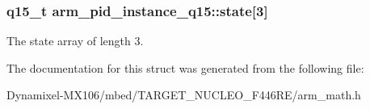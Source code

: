 \subsubsection[{\texorpdfstring{state}{state}}]{\setlength{\rightskip}{0pt plus 5cm}q15\+\_\+t arm\+\_\+pid\+\_\+instance\+\_\+q15\+::state\mbox{[}3\mbox{]}}\hypertarget{structarm__pid__instance__q15_a4a3f0a878b5b6b055e3478a2f244cd30}{}\label{structarm__pid__instance__q15_a4a3f0a878b5b6b055e3478a2f244cd30}
The state array of length 3. 

The documentation for this struct was generated from the following file\+:\begin{DoxyCompactItemize}
\item 
Dynamixel-\/\+M\+X106/mbed/\+T\+A\+R\+G\+E\+T\+\_\+\+N\+U\+C\+L\+E\+O\+\_\+\+F446\+R\+E/arm\+\_\+math.\+h\end{DoxyCompactItemize}

